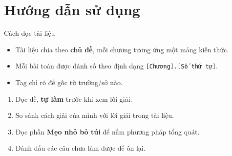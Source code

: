 \chapter*{Hướng dẫn sử dụng}

\begin{meobotui}{Cách đọc tài liệu}
  \begin{itemize}[leftmargin=2em, itemsep=4pt]
    \item Tài liệu chia theo \textbf{chủ đề}, mỗi chương tương ứng một mảng kiến thức.
    \item Mỗi bài toán được đánh số theo định dạng \texttt{[Chương].[Số thứ tự]}.
    \item Tag  chỉ rõ đề gốc từ trường/sở nào.
  \end{itemize}
\end{meobotui}

\vspace{10pt}

\begin{prompt}[title={Gợi ý cách học}]
  \begin{enumerate}[leftmargin=2em, itemsep=4pt]
    \item Đọc đề, \textbf{tự làm} trước khi xem lời giải.
    \item So sánh cách giải của mình với lời giải trong tài liệu.
    \item Đọc phần \textbf{Mẹo nhỏ bỏ túi} để nắm phương pháp tổng quát.
    \item Đánh dấu các câu chưa làm được để ôn lại.
  \end{enumerate}
\end{prompt}

\clearpage
